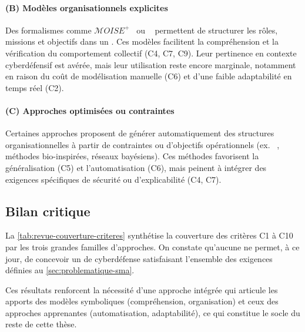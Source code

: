 \paragraph{(B) Modèles organisationnels explicites}

Des formalismes comme $\mathcal{M}OISE^+$~\cite{hubner2002moise} ou ~\cite{Ferber2004} permettent de structurer les rôles, missions et objectifs dans un . Ces modèles facilitent la compréhension et la vérification du comportement collectif (C4, C7, C9). Leur pertinence en contexte cyberdéfensif est avérée, mais leur utilisation reste encore marginale, notamment en raison du coût de modélisation manuelle (C6) et d'une faible adaptabilité en temps réel (C2).

\paragraph{(C) Approches optimisées ou contraintes}

Certaines approches proposent de générer automatiquement des structures organisationnelles à partir de contraintes ou d'objectifs opérationnels (ex. ~\cite{modi2005adopt}, méthodes bio-inspirées, réseaux bayésiens). Ces méthodes favorisent la généralisation (C5) et l'automatisation (C6), mais peinent à intégrer des exigences spécifiques de sécurité ou d'explicabilité (C4, C7).

\subsection*{Bilan critique}

La \autoref{tab:revue-couverture-criteres} synthétise la couverture des critères C1 à C10 par les trois grandes familles d'approches. On constate qu'aucune ne permet, à ce jour, de concevoir un  de cyberdéfense satisfaisant l'ensemble des exigences définies au \autoref{sec:problematique-sma}.



Ces résultats renforcent la nécessité d'une approche intégrée qui articule les apports des modèles symboliques (compréhension, organisation) et ceux des approches apprenantes (automatisation, adaptabilité), ce qui constitue le socle du reste de cette thèse.


